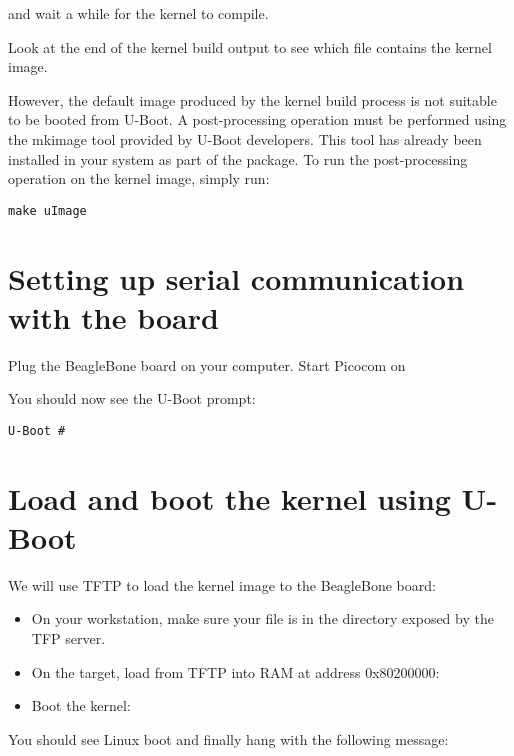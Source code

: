 and wait a while for the kernel to compile.

Look at the end of the kernel build output to see which file contains
the kernel image.

However, the default image produced by the kernel build process is not
suitable to be booted from U-Boot. A post-processing operation must be
performed using the mkimage tool provided by U-Boot developers. This
tool has already been installed in your system as part of the
 package. To run the post-processing operation on
the kernel image, simply run:

\begin{verbatim}
make uImage
\end{verbatim}

\section{Setting up serial communication with the board}

Plug the BeagleBone board on your computer. Start Picocom on 

You should now see the U-Boot prompt:

\begin{verbatim}
U-Boot #
\end{verbatim}

\section{Load and boot the kernel using U-Boot}

We will use TFTP to load the kernel image to the BeagleBone board:

\begin{itemize}

\item On your workstation, make sure your  file is in the
  directory exposed by the TFP server.

\item On the target, load  from TFTP into RAM at address
  0x80200000:\\

\item Boot the kernel:\\

\end{itemize}

You should see Linux boot and finally hang with the following message:


